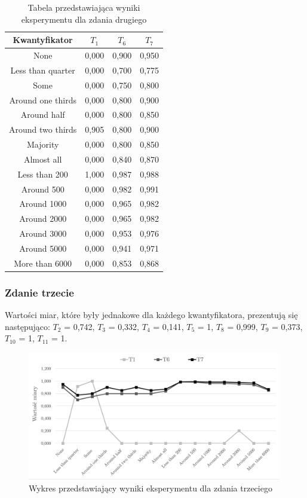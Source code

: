 \documentclass{classrep}
\begin{document}
\begin{table}[H]
	\centering
	\begin{tabular}{c c c c} 
		\hline
		\textbf{Kwantyfikator}  & \textbf{$T_1$} & \textbf{$T_6$} & \textbf{$T_7$}\\ [0.5ex] 
		\hline
None	&	0,000	&	0,900	&	0,950	\\
Less than quarter	&	0,000	&	0,700	&	0,775	\\
Some 	&	0,000	&	0,750	&	0,800	\\
Around one thirds 	&	0,000	&	0,800	&	0,900	\\
Around half 	&	0,000	&	0,800	&	0,850	\\
Around two thirds 	&	0,905	&	0,800	&	0,900	\\
Majority 	&	0,000	&	0,800	&	0,850	\\
Almost all	&	0,000	&	0,840	&	0,870	\\
Less than 200	&	1,000	&	0,987	&	0,988	\\
Around 500	&	0,000	&	0,982	&	0,991	\\
Around 1000	&	0,000	&	0,965	&	0,982	\\
Around 2000	&	0,000	&	0,965	&	0,982	\\
Around 3000	&	0,000	&	0,953	&	0,976	\\
Around 5000	&	0,000	&	0,941	&	0,971	\\
More than 6000	&	0,000	&	0,853	&	0,868	\\
		\hline
	\end{tabular}
	\caption{Tabela przedstawiająca wyniki eksperymentu dla zdania drugiego}
\end{table}

\clearpage



\subsubsection{Zdanie trzecie}

Wartości miar, które były jednakowe dla każdego kwantyfikatora, prezentują się następująco:
$T_2$ = 0,742, $T_3$ = 0,332, $T_4$ = 0,141, $T_5$ = 1, $T_8$ = 0,999, $T_9$ = 0,373, $T_{10}$ = 1, $T_{11}$ = 1.

\begin{figure}[H]
	\centering
	\includegraphics[width=0.99\textwidth]{Pictures/ResultCharts/Eks1_3.png}
	\caption{Wykres przedstawiający wyniki eksperymentu dla zdania trzeciego}
\end{figure}
\end{document}
